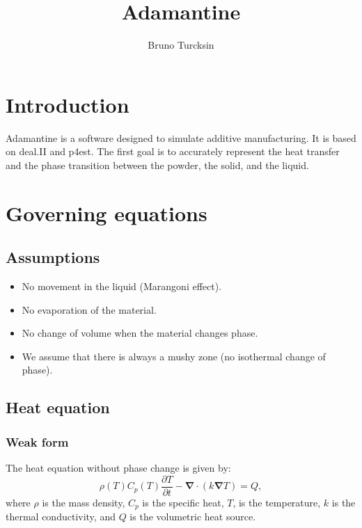 \documentclass[letterpaper]{article}
\newcommand\bn{\boldsymbol{\nabla}}
\renewcommand{\(}{\left(}
\renewcommand{\)}{\right)}
\renewcommand{\[}{\left[}
\renewcommand{\]}{\right]}
\begin{document}
\title{Adamantine}
\author{Bruno Turcksin} 
\date{}
\maketitle

\section{Introduction}
Adamantine is a software designed to simulate additive manufacturing. It is based on
deal.II and p4est. The first goal is to accurately represent the heat transfer
and the phase transition between the powder, the solid, and the liquid.

\section{Governing equations}
\subsection{Assumptions}
\begin{itemize}
  \item No movement in the liquid (Marangoni effect).
  \item No evaporation of the material.
  \item No change of volume when the material changes phase.
  \item We assume that there is always a mushy zone (no isothermal change
    of phase).
\end{itemize}
\subsection{Heat equation}
\subsubsection{Weak form}
The heat equation without phase change is given by:
\begin{equation}
  \rho(T) C_p(T) \frac{\partial T}{\partial t} - \bn \cdot \(k\bn T\) = Q,
\end{equation}
where $\rho$ is the mass density, $C_p$ is the specific heat, $T$, is the
temperature, $k$ is the thermal conductivity, and $Q$ is the volumetric heat
source.
\end{document}

